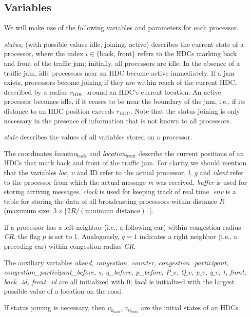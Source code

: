 \documentclass{acmrip}
\begin{document}
\subsection{Variables}

We will make use of the following variables and parameters for each
processor.


{\em status}$_i$ (with possible values idle, joining, active)
describes the current state of a processor, where the index $i \in
\{$back, front$\}$ refers to the HDCs marking back and front of the
traffic jam; initially, all processors are idle. In the absence of a
traffic jam, idle processors near an HDC become active
immediately. If a jam exists, processors become joining if they are
within reach of the current HDC, described by a radius
$r_{\mathrm{HDC}}$ around an HDC's current location.
An active processor becomes idle, if it ceases to be near the
boundary of the
jam, i.e., if its distance to an HDC position exceeds
$r_{\mathrm{HDC}}$. Note that the status joining is only necessary
in the presence of information that is not known to all processors.

{\em state} describes the values of all variables stored on a
processor.

The coordinates {\em location}$_\mathrm{back}$ and {\em location}$_\mathrm{front}$
describe the current positions of an HDCs that mark back and front of
the traffic jam. For clarity we should mention that the variables
\textit{loc, v} and ID refer to the actual processor, \textit{l, g}
and \textit{ident} refer to the processor from which the actual
message \textit{m} was received. {\em buffer} is used for storing
arriving messages. {\em clock} is used for keeping track of real
time. {\em env} is a table for storing the data of all broadcasting
processors within distance $R$ (maximum size: $3 \times \lceil
2R/(\mbox{minimum distance})\rceil$).

If a processor has a left neighbor (i.e., a following car) within
congestion radius {\em CR}, the flag $p$ is set to 1. Analogously, $q=1$
indicates a right neighbor (i.e., a preceding car) within congestion
radius {\em CR}.

The auxiliary variables {\em ahead, congestion\_counter,
congestion\_participant, congestion\_participant\_before, s,
q\_before, p\_before, P$\_v$, Q$\_v$, p$\_v$, q$\_v$, t, front,
back\_id, front\_id} are all initialized with 0; {\em back} is
initialized with the largest possible value of a location on the
road.

If status joining is necessary, then $v_{0_\mathrm{back}}$,
$v_{0_\mathrm{front}}$ are the initial states of an HDCs.
\end{document}
